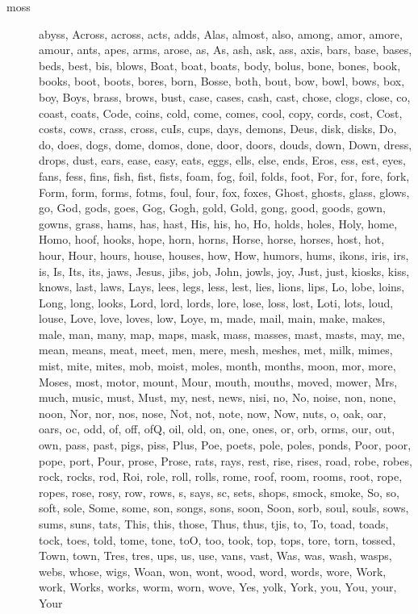 \begin{description}
  \item[moss] abyss, Across, across, acts, adds, Alas, almost, also, among, amor, amore, amour, ants, apes, arms, arose, as, As, ash, ask, ass, axis, bars, base, bases, beds, best, bis, blows, Boat, boat, boats, body, bolus, bone, bones, book, books, boot, boots, bores, born, Bosse, both, bout, bow, bowl, bows, box, boy, Boys, brass, brows, bust, case, cases, cash, cast, chose, clogs, close, co, coast, coats, Code, coins, cold, come, comes, cool, copy, cords, cost, Cost, costs, cows, crass, cross, cuIs, cups, days, demons, Deus, disk, disks, Do, do, does, dogs, dome, domos, done, door, doors, douds, down, Down, dress, drops, dust, ears, ease, easy, eats, eggs, ells, else, ends, Eros, ess, est, eyes, fans, fess, fins, fish, fist, fists, foam, fog, foil, folds, foot, For, for, fore, fork, Form, form, forms, fotms, foul, four, fox, foxes, Ghost, ghosts, glass, glows, go, God, gods, goes, Gog, Gogh, gold, Gold, gong, good, goods, gown, gowns, grass, hams, has, hast, His, his, ho, Ho, holds, holes, Holy, home, Homo, hoof, hooks, hope, horn, horns, Horse, horse, horses, host, hot, hour, Hour, hours, house, houses, how, How, humors, hums, ikons, iris, irs, is, Is, Its, its, jaws, Jesus, jibs, job, John, jowls, joy, Just, just, kiosks, kiss, knows, last, laws, Lays, lees, legs, less, lest, lies, lions, lips, Lo, lobe, loins, Long, long, looks, Lord, lord, lords, lore, lose, loss, lost, Loti, lots, loud, louse, Love, love, loves, low, Loye, m, made, mail, main, make, makes, male, man, many, map, maps, mask, mass, masses, mast, masts, may, me, mean, means, meat, meet, men, mere, mesh, meshes, met, milk, mimes, mist, mite, mites, mob, moist, moles, month, months, moon, mor, more, Moses, most, motor, mount, Mour, mouth, mouths, moved, mower, Mrs, much, music, must, Must, my, nest, news, nisi, no, No, noise, non, none, noon, Nor, nor, nos, nose, Not, not, note, now, Now, nuts, o, oak, oar, oars, oc, odd, of, off, ofQ, oil, old, on, one, ones, or, orb, orms, our, out, own, pass, past, pigs, piss, Plus, Poe, poets, pole, poles, ponds, Poor, poor, pope, port, Pour, prose, Prose, rats, rays, rest, rise, rises, road, robe, robes, rock, rocks, rod, Roi, role, roll, rolls, rome, roof, room, rooms, root, rope, ropes, rose, rosy, row, rows, s, says, sc, sets, shops, smock, smoke, So, so, soft, sole, Some, some, son, songs, sons, soon, Soon, sorb, soul, souls, sows, sums, suns, tats, This, this, those, Thus, thus, tjis, to, To, toad, toads, tock, toes, told, tome, tone, toO, too, took, top, tops, tore, torn, tossed, Town, town, Tres, tres, ups, us, use, vans, vast, Was, was, wash, wasps, webs, whose, wigs, Woan, won, wont, wood, word, words, wore, Work, work, Works, works, worm, worn, wove, Yes, yolk, York, you, You, your, Your
\end{description}


